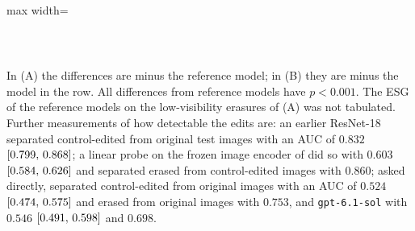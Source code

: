 \begin{table}[!htbp]
\begin{adjustbox}{max width=\linewidth}
\begin{tabular}{llcccc}
\bottomrule
\end{tabular}
\end{adjustbox}
\\[2pt]\parbox{\linewidth}{\footnotesize In (A) the differences are \ms{} minus the reference model; in (B) they are \msn{} minus the model in the row. All differences from reference models have $p < 0.001$. The ESG of the reference models on the low-visibility erasures of (A) was not tabulated. Further measurements of how detectable the edits are: an earlier ResNet-18 separated control-edited from original test images with an AUC of $0.832$ $[0.799,\,0.868]$; a linear probe on the frozen image encoder of \base{} did so with $0.603$ $[0.584,\,0.626]$ and separated erased from control-edited images with $0.860$; asked directly, \gem{} separated control-edited from original images with an AUC of $0.524$ $[0.474,\,0.575]$ and erased from original images with $0.753$, and \texttt{gpt-6.1-sol} with $0.546$ $[0.491,\,0.598]$ and $0.698$.}
\end{table}

